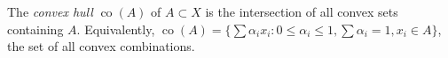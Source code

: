The \emph{convex hull} $\operatorname{co}(A)$ of $A \subset X$ is the intersection of all convex sets containing $A$. Equivalently, $\operatorname{co}(A) = \{\sum \alpha_i x_i : 0 \leqslant \alpha_i \leqslant 1, \sum \alpha_i = 1, x_i \in A\}$, the set of all convex combinations.
